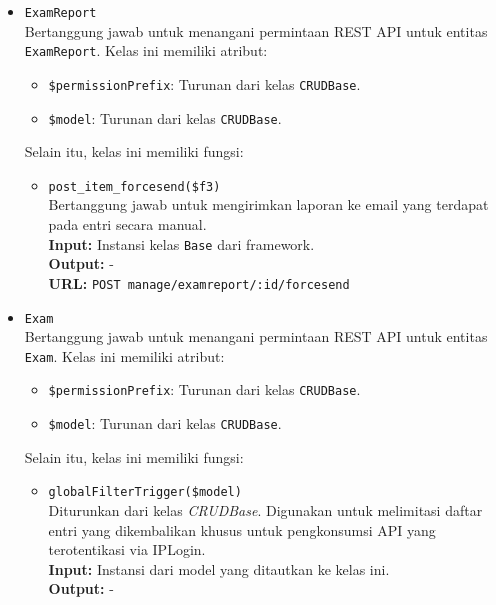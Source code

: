 \begin{itemize}
        \item \texttt{ExamReport}\\
            Bertanggung jawab untuk menangani permintaan REST API untuk entitas \texttt{ExamReport}. 
            Kelas ini memiliki atribut:
            \begin{itemize}
                \item \texttt{\$permissionPrefix}: Turunan dari kelas \texttt{CRUDBase}.
                \item \texttt{\$model}: Turunan dari kelas \texttt{CRUDBase}.
            \end{itemize}
            Selain itu, kelas ini memiliki fungsi:
            \begin{itemize}
                \item \texttt{post\_item\_forcesend(\$f3)} \\
                    Bertanggung jawab untuk mengirimkan laporan ke email yang terdapat pada entri
                    secara manual.\\
                    \textbf{Input:} Instansi kelas \texttt{Base} dari framework.\\
                    \textbf{Output:} -\\
                    \textbf{URL:} \texttt{POST manage/examreport/:id/forcesend}
            \end{itemize}
        
        \item \texttt{Exam}\\
            Bertanggung jawab untuk menangani permintaan REST API untuk entitas \texttt{Exam}. 
            Kelas ini memiliki atribut:
            \begin{itemize}
                \item \texttt{\$permissionPrefix}: Turunan dari kelas \texttt{CRUDBase}.
                \item \texttt{\$model}: Turunan dari kelas \texttt{CRUDBase}.
            \end{itemize}
            Selain itu, kelas ini memiliki fungsi:
            \begin{itemize}
                \item \texttt{globalFilterTrigger(\$model)} \\
                    Diturunkan dari kelas \textit{CRUDBase}. Digunakan untuk melimitasi
                    daftar entri yang dikembalikan khusus untuk pengkonsumsi API yang
                    terotentikasi via IPLogin. \\
                    \textbf{Input:} Instansi dari model yang ditautkan ke kelas ini.\\
                    \textbf{Output:} -
                

\end{itemize}
\end{itemize}
